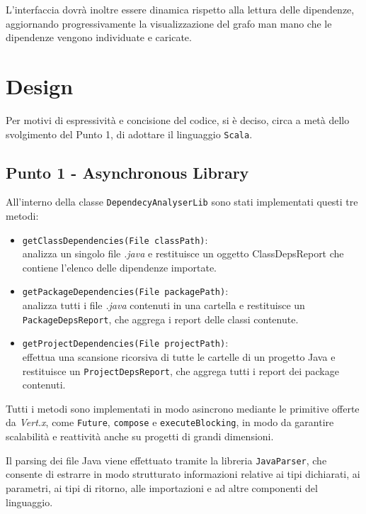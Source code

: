 \documentclass[a4paper,12pt]{report}
\begin{document}
    L'interfaccia dovrà inoltre essere dinamica rispetto alla lettura delle dipendenze, aggiornando progressivamente la visualizzazione del grafo man mano che le dipendenze vengono individuate e caricate.

    \chapter{Design}
    Per motivi di espressività e concisione del codice, si è deciso, circa a metà dello svolgimento del Punto 1, di adottare il linguaggio \texttt{Scala}.

    \section{Punto 1 - Asynchronous Library}
    All'interno della classe \texttt{DependecyAnalyserLib} sono stati implementati questi tre metodi:
    \begin{itemize}
        \item \texttt{getClassDependencies(File classPath)}: \\analizza un singolo file \emph{.java} e restituisce un oggetto ClassDepsReport che contiene l'elenco delle dipendenze importate.

        \item \texttt{getPackageDependencies(File packagePath)}: \\analizza tutti i file \emph{.java} contenuti in una cartella e restituisce un \texttt{PackageDepsReport}, che aggrega i report delle classi contenute.

        \item \texttt{getProjectDependencies(File projectPath)}: \\effettua una scansione ricorsiva di tutte le cartelle di un progetto Java e restituisce un \texttt{ProjectDepsReport}, che aggrega tutti i report dei package contenuti.
    \end{itemize}

    Tutti i metodi sono implementati in modo asincrono mediante le primitive offerte da \emph{Vert.x}, come \texttt{Future}, \texttt{compose} e \texttt{executeBlocking}, in modo da garantire scalabilità e reattività anche su progetti di grandi dimensioni.

    Il parsing dei file Java viene effettuato tramite la libreria \texttt{JavaParser}, che consente di estrarre in modo strutturato informazioni relative ai tipi dichiarati, ai parametri, ai tipi di ritorno, alle importazioni e ad altre componenti del linguaggio.
\end{document}
